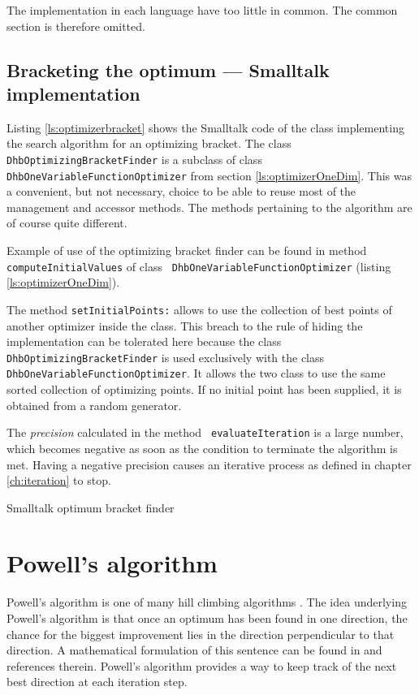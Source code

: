 \documentclass[twoside]{book}
\begin{document}
\noindent The implementation in each language have too little in
common. The common section is therefore omitted.

\subsection{Bracketing the optimum --- Smalltalk implementation}
\label{sec:sbracket}  Listing
\ref{ls:optimizerbracket} shows the Smalltalk code of the class
implementing the search algorithm for an optimizing bracket. The
class {\tt DhbOptimizingBracketFinder} is a subclass of class {\tt
DhbOneVariableFunctionOptimizer} from section
\ref{ls:optimizerOneDim}. This was a convenient, but not
necessary, choice to be able to reuse most of the management and
accessor methods. The methods pertaining to the algorithm are of
course quite different.

Example of use of the optimizing bracket finder can be found in
method {\tt computeInitialValues} of class {\tt
DhbOneVariableFunctionOptimizer} (\cf listing
\ref{ls:optimizerOneDim}).

The method {\tt setInitialPoints:} allows to use the collection of
best points of another optimizer inside the class. This breach to
the rule of hiding the implementation can be tolerated here
because the class {\tt DhbOptimizingBracketFinder} is used
exclusively with the class {\tt DhbOneVariableFunctionOptimizer}.
It allows the two class to use the same sorted collection of
optimizing points. If no initial point has been supplied, it is
obtained from a random generator.

The {\sl precision} calculated in the method {\tt
evaluateIteration} is a large number, which becomes negative as
soon as the condition to terminate the algorithm is met. Having a
negative precision causes an iterative process as defined in
chapter \ref{ch:iteration} to stop.

\begin{listing} Smalltalk optimum bracket finder \label{ls:optimizerbracket}

\end{listing}


\section{Powell's algorithm}
\label{sec:powell}Powell's algorithm is one of many hill climbing
algorithms \cite{Press}. The idea underlying Powell's algorithm is
that once an optimum has been found in one direction, the chance
for the biggest improvement lies in the direction perpendicular to
that direction. A mathematical formulation of this sentence can be
found in \cite{Press} and references therein. Powell's algorithm
provides a way to keep track of the next best direction at each
iteration step.
\end{document}
